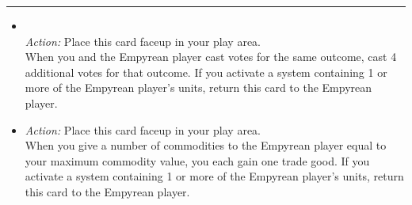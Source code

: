 \begin{multicols}{2}
\vspace{-10pt}\rule{\hsize}{0.4pt}\vspace{5pt}


\begin{itemize}
\item {}\\
\emph{Action:} Place this card faceup in your play area.\\
When you and the Empyrean player cast votes for the same outcome, cast 4 additional votes for that outcome. If you activate a system containing 1 or more of the Empyrean player's units, return this card to the Empyrean player.
\item {}
\emph{Action:} Place this card faceup in your play area.\\
When you give a number of commodities to the Empyrean player equal to your maximum commodity value, you each gain one trade good. If you activate a system containing 1 or more of the Empyrean player's units, return this card to the Empyrean player.
\end{itemize}

\end{multicols}



